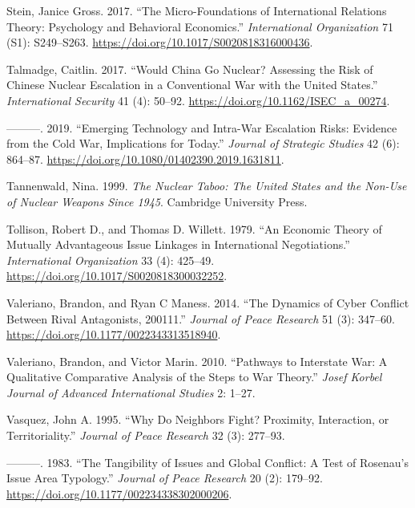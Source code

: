 \documentclass[
]{article}
\begin{document}
\leavevmode\hypertarget{ref-stein_microfoundationsinternationalrelations_2017}{}%
Stein, Janice Gross. 2017. ``The Micro-Foundations of International Relations Theory: Psychology and Behavioral Economics.'' \emph{International Organization} 71 (S1): S249--S263. \url{https://doi.org/10.1017/S0020818316000436}.

\leavevmode\hypertarget{ref-talmadge_wouldchinago_2017}{}%
Talmadge, Caitlin. 2017. ``Would China Go Nuclear? Assessing the Risk of Chinese Nuclear Escalation in a Conventional War with the United States.'' \emph{International Security} 41 (4): 50--92. \url{https://doi.org/10.1162/ISEC_a_00274}.

\leavevmode\hypertarget{ref-talmadge_emergingtechnologyintrawar_2019}{}%
---------. 2019. ``Emerging Technology and Intra-War Escalation Risks: Evidence from the Cold War, Implications for Today.'' \emph{Journal of Strategic Studies} 42 (6): 864--87. \url{https://doi.org/10.1080/01402390.2019.1631811}.

\leavevmode\hypertarget{ref-tannenwald_nucleartaboounited_1999}{}%
Tannenwald, Nina. 1999. \emph{The Nuclear Taboo: The United States and the Non-Use of Nuclear Weapons Since 1945}. Cambridge University Press.

\leavevmode\hypertarget{ref-tollison_economictheorymutually_1979}{}%
Tollison, Robert D., and Thomas D. Willett. 1979. ``An Economic Theory of Mutually Advantageous Issue Linkages in International Negotiations.'' \emph{International Organization} 33 (4): 425--49. \url{https://doi.org/10.1017/S0020818300032252}.

\leavevmode\hypertarget{ref-valeriano_dynamicscyberconflict_2014}{}%
Valeriano, Brandon, and Ryan C Maness. 2014. ``The Dynamics of Cyber Conflict Between Rival Antagonists, 200111.'' \emph{Journal of Peace Research} 51 (3): 347--60. \url{https://doi.org/10.1177/0022343313518940}.

\leavevmode\hypertarget{ref-valeriano_pathwaysinterstatewar_2010}{}%
Valeriano, Brandon, and Victor Marin. 2010. ``Pathways to Interstate War: A Qualitative Comparative Analysis of the Steps to War Theory.'' \emph{Josef Korbel Journal of Advanced International Studies} 2: 1--27.

\leavevmode\hypertarget{ref-vasquez_whyneighborsfight_1995}{}%
Vasquez, John A. 1995. ``Why Do Neighbors Fight? Proximity, Interaction, or Territoriality.'' \emph{Journal of Peace Research} 32 (3): 277--93.

\leavevmode\hypertarget{ref-vasquez_tangibilityissuesglobal_1983}{}%
---------. 1983. ``The Tangibility of Issues and Global Conflict: A Test of Rosenau's Issue Area Typology.'' \emph{Journal of Peace Research} 20 (2): 179--92. \url{https://doi.org/10.1177/002234338302000206}.
\end{document}
